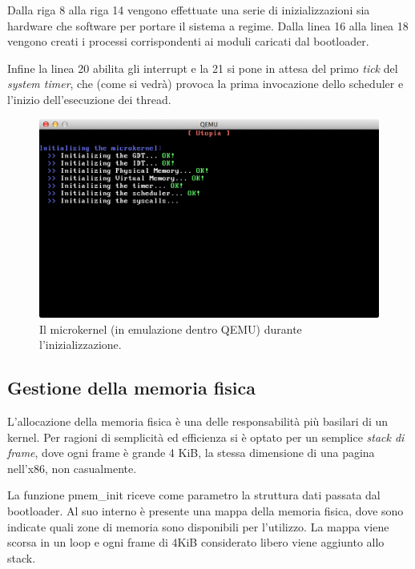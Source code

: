 \documentclass[12pt,a4paper]{report}
\begin{document}
			
			
			Dalla riga 8 alla riga 14 vengono effettuate una serie di inizializzazioni sia hardware che software
			per portare il sistema a regime. Dalla linea 16 alla linea 18 vengono creati i processi corrispondenti
			ai moduli caricati dal bootloader.
			
			Infine la linea 20 abilita gli interrupt e la 21 si pone in attesa del primo \emph{tick} del \emph{system timer},
			che (come si vedrà) provoca la prima invocazione dello scheduler e l'inizio dell'esecuzione dei thread.
			
			\begin{figure}[htbp]
			\centering
			\includegraphics[scale=0.55]{img/boot.png}
			\caption{Il microkernel (in emulazione dentro QEMU) durante l'inizializzazione.\label{fig:boot}}
			\end{figure}
		
		\subsection{Gestione della memoria fisica}
			L'allocazione della memoria fisica è una delle responsabilità più basilari di un kernel.
			Per ragioni di semplicità ed efficienza si è optato per un semplice \emph{stack di frame},
			dove ogni frame è grande 4 KiB, la stessa dimensione di una pagina nell'x86, non casualmente.
			
			
			
			La funzione pmem\_init riceve come parametro la struttura dati passata dal bootloader.
			Al suo interno è presente una mappa della memoria fisica, dove sono indicate quali
			zone di memoria sono disponibili per l'utilizzo. La mappa viene scorsa in un loop
			e ogni frame di 4KiB considerato libero viene aggiunto allo stack.
			
\end{document}
